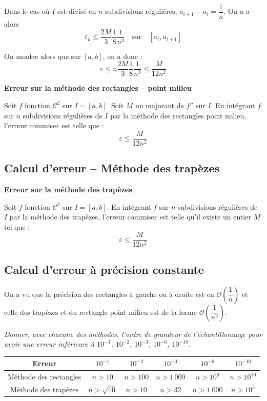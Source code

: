 \documentclass[10pt]{article}
\begin{document}
Dans le cas où $I$ est divisé en $n$ subdivisions régulières, $a_{i+1}-a_i = \dfrac{1}{n}$. On a a alors 
$$
\varepsilon_k \leq \dfrac{2M}{3}\dfrac{1}{8}\dfrac{1}{n^3} \quad \text{sur}\quad [a_i,a_{i+1}]
$$

On montre alors que sur $[a,b]$, on a donc :
$$
\varepsilon \leq n \dfrac{2M}{3}\dfrac{1}{8}\dfrac{1}{n^3} \leq \dfrac{M}{12 n^2}
$$


\begin{resultat}
\textbf{Erreur sur la méthode des rectangles -- point milieu}

Soit $f$ fonction $\mathcal{C}^2$ sur $I=[a,b]$. Soit $M$ un majorant de $f''$ sur $I$. En intégrant $f$ sur $n$ subdivisions régulières de $I$ par la méthode des rectangles point milieu, l'erreur commise$\varepsilon$ est telle que : 
$$ \varepsilon \leq \dfrac{M}{12n^2}$$ 

\end{resultat}

\subsection{Calcul d'erreur -- Méthode des trapèzes}


\begin{resultat}
\textbf{Erreur sur la méthode des trapèzes}

Soit $f$ fonction $\mathcal{C}^2$ sur $I=[a,b]$. %
En intégrant $f$ sur $n$ subdivisions régulières de $I$ par la méthode des trapèzes, l'erreur commise$\varepsilon$ est telle qu'il existe un entier $M$ tel que : 
$$ \varepsilon \leq \dfrac{M}{12n^2}$$ 

\end{resultat}

\subsection{Calcul d'erreur à précision constante}

On a vu que la précision des rectangles à gauche ou à droite est en $\mathcal{O}\left(\dfrac{1}{n}\right)$ et celle des trapèzes et du rectangle point milieu est de la forme $\mathcal{O}\left(\dfrac{1}{n^2}\right)$.

\begin{exemple}
\textit{Donner, avec chacune des méthodes, l'ordre de grandeur de l'échantillonnage pour avoir une erreur inférieure à $10^{-1}$, $10^{-2}$, $10^{-3}$, $10^{-6}$, $10^{-10}$. }
\begin{center}
\begin{tabular}{|c|c|c|c|c|c|}
\hline
Erreur & $10^{-1}$ & $10^{-2}$ & $10^{-3}$ & $10^{-6}$ & $10^{-10}$ \\
\hline
\hline
Méthode des rectangles & $n>10$ & $n>100$ & $n>1\,000$ & $n>10^6$ & $n>10^{10}$  \\
\hline
Méthode des trapèzes & $n>\sqrt{10}$ & $n>10$ & $n>32$ & $n>1\;000$ & $n>10^5$ \\
\hline
\end{tabular}
\end{center}
\end{exemple}
 
\end{document}
